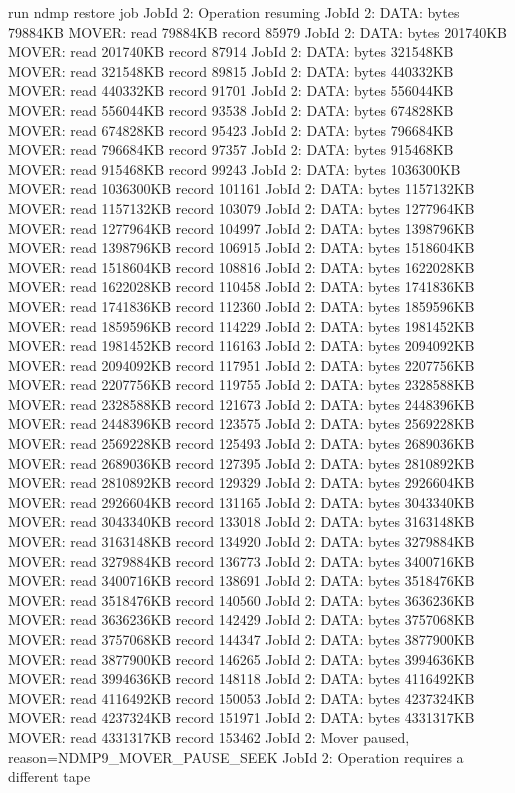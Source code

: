 \begin{bconsole}{run ndmp restore job}
JobId 2: Operation resuming
JobId 2: DATA: bytes 79884KB  MOVER: read 79884KB record 85979
JobId 2: DATA: bytes 201740KB  MOVER: read 201740KB record 87914
JobId 2: DATA: bytes 321548KB  MOVER: read 321548KB record 89815
JobId 2: DATA: bytes 440332KB  MOVER: read 440332KB record 91701
JobId 2: DATA: bytes 556044KB  MOVER: read 556044KB record 93538
JobId 2: DATA: bytes 674828KB  MOVER: read 674828KB record 95423
JobId 2: DATA: bytes 796684KB  MOVER: read 796684KB record 97357
JobId 2: DATA: bytes 915468KB  MOVER: read 915468KB record 99243
JobId 2: DATA: bytes 1036300KB  MOVER: read 1036300KB record 101161
JobId 2: DATA: bytes 1157132KB  MOVER: read 1157132KB record 103079
JobId 2: DATA: bytes 1277964KB  MOVER: read 1277964KB record 104997
JobId 2: DATA: bytes 1398796KB  MOVER: read 1398796KB record 106915
JobId 2: DATA: bytes 1518604KB  MOVER: read 1518604KB record 108816
JobId 2: DATA: bytes 1622028KB  MOVER: read 1622028KB record 110458
JobId 2: DATA: bytes 1741836KB  MOVER: read 1741836KB record 112360
JobId 2: DATA: bytes 1859596KB  MOVER: read 1859596KB record 114229
JobId 2: DATA: bytes 1981452KB  MOVER: read 1981452KB record 116163
JobId 2: DATA: bytes 2094092KB  MOVER: read 2094092KB record 117951
JobId 2: DATA: bytes 2207756KB  MOVER: read 2207756KB record 119755
JobId 2: DATA: bytes 2328588KB  MOVER: read 2328588KB record 121673
JobId 2: DATA: bytes 2448396KB  MOVER: read 2448396KB record 123575
JobId 2: DATA: bytes 2569228KB  MOVER: read 2569228KB record 125493
JobId 2: DATA: bytes 2689036KB  MOVER: read 2689036KB record 127395
JobId 2: DATA: bytes 2810892KB  MOVER: read 2810892KB record 129329
JobId 2: DATA: bytes 2926604KB  MOVER: read 2926604KB record 131165
JobId 2: DATA: bytes 3043340KB  MOVER: read 3043340KB record 133018
JobId 2: DATA: bytes 3163148KB  MOVER: read 3163148KB record 134920
JobId 2: DATA: bytes 3279884KB  MOVER: read 3279884KB record 136773
JobId 2: DATA: bytes 3400716KB  MOVER: read 3400716KB record 138691
JobId 2: DATA: bytes 3518476KB  MOVER: read 3518476KB record 140560
JobId 2: DATA: bytes 3636236KB  MOVER: read 3636236KB record 142429
JobId 2: DATA: bytes 3757068KB  MOVER: read 3757068KB record 144347
JobId 2: DATA: bytes 3877900KB  MOVER: read 3877900KB record 146265
JobId 2: DATA: bytes 3994636KB  MOVER: read 3994636KB record 148118
JobId 2: DATA: bytes 4116492KB  MOVER: read 4116492KB record 150053
JobId 2: DATA: bytes 4237324KB  MOVER: read 4237324KB record 151971
JobId 2: DATA: bytes 4331317KB  MOVER: read 4331317KB record 153462
JobId 2: Mover paused, reason=NDMP9_MOVER_PAUSE_SEEK
JobId 2: Operation requires a different tape

\end{bconsole}
